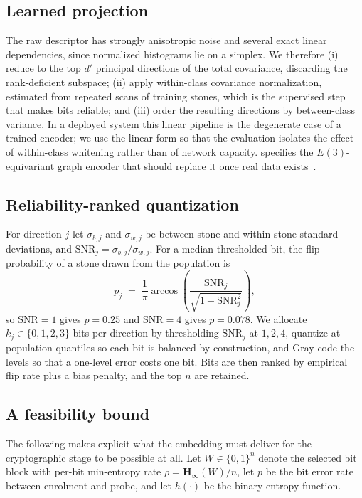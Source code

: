 \documentclass[10pt,twocolumn]{article}
\theoremstyle{remark}
\newcommand{\bits}{\{0,1\}}
\newcommand{\hinf}{\mathbf{H}_\infty}
\begin{document}
\subsection{Learned projection}

The raw descriptor has strongly anisotropic noise and several exact linear
dependencies, since normalized histograms lie on a simplex. We therefore
(i) reduce to the top $d'$ principal directions of the total covariance,
discarding the rank-deficient subspace; (ii) apply within-class covariance
normalization, estimated from repeated scans of training stones, which is the
supervised step that makes bits reliable; and (iii) order the resulting
directions by between-class variance. In a deployed system this linear pipeline
is the degenerate case of a trained encoder; we use the linear form so that the
evaluation isolates the effect of within-class whitening rather than of network
capacity.  specifies the $E(3)$-equivariant graph encoder that
should replace it once real data exists~\cite{satorras2021,zaheer2017,qi2017}.

\subsection{Reliability-ranked quantization}

For direction $j$ let $\sigma_{b,j}$ and $\sigma_{w,j}$ be between-stone and
within-stone standard deviations, and $\mathrm{SNR}_j = \sigma_{b,j}/\sigma_{w,j}$.
For a median-thresholded bit, the flip probability of a stone drawn from the
population is
\begin{equation}
p_j \;=\; \frac{1}{\pi}\arccos\!\left(\frac{\mathrm{SNR}_j}{\sqrt{1+\mathrm{SNR}_j^2}}\right),
\label{eq:flip}
\end{equation}
so $\mathrm{SNR}=1$ gives $p=0.25$ and $\mathrm{SNR}=4$ gives $p=0.078$. We
allocate $k_j \in \{0,1,2,3\}$ bits per direction by thresholding $\mathrm{SNR}_j$
at $1, 2, 4$, quantize at population quantiles so each bit is balanced by
construction, and Gray-code the levels so that a one-level error costs one bit.
Bits are then ranked by empirical flip rate plus a bias penalty, and the top $n$
are retained.

\subsection{A feasibility bound}

The following makes explicit what the embedding must deliver for the
cryptographic stage to be possible at all. Let $W \in \bits^n$ denote the
selected bit block with per-bit min-entropy rate $\rho = \hinf(W)/n$, let $p$ be
the bit error rate between enrolment and probe, and let $h(\cdot)$ be the binary
entropy function.
\end{document}
